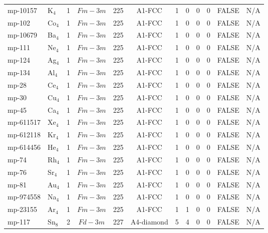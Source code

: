 {\begin{longtable}{llcccccccccc}
    mp-10157 & K$_{4}$ & 1     & $Fm-3m$ & 225   & A1-FCC & 1     & 0     & 0     & 0     & FALSE & N/A \\
    mp-102 & Co$_{4}$ & 1     & $Fm-3m$ & 225   & A1-FCC & 1     & 0     & 0     & 0     & FALSE & N/A \\
    mp-10679 & Ba$_{4}$ & 1     & $Fm-3m$ & 225   & A1-FCC & 1     & 0     & 0     & 0     & FALSE & N/A \\
    mp-111 & Ne$_{4}$ & 1     & $Fm-3m$ & 225   & A1-FCC & 1     & 0     & 0     & 0     & FALSE & N/A \\
    mp-124 & Ag$_{4}$ & 1     & $Fm-3m$ & 225   & A1-FCC & 1     & 0     & 0     & 0     & FALSE & N/A \\
    mp-134 & Al$_{4}$ & 1     & $Fm-3m$ & 225   & A1-FCC & 1     & 0     & 0     & 0     & FALSE & N/A \\
    mp-28 & Ce$_{4}$ & 1     & $Fm-3m$ & 225   & A1-FCC & 1     & 0     & 0     & 0     & FALSE & N/A \\
    mp-30 & Cu$_{4}$ & 1     & $Fm-3m$ & 225   & A1-FCC & 1     & 0     & 0     & 0     & FALSE & N/A \\
    mp-45 & Ca$_{4}$ & 1     & $Fm-3m$ & 225   & A1-FCC & 1     & 0     & 0     & 0     & FALSE & N/A \\
    mp-611517 & Xe$_{4}$ & 1     & $Fm-3m$ & 225   & A1-FCC & 1     & 0     & 0     & 0     & FALSE & N/A \\
    mp-612118 & Kr$_{4}$ & 1     & $Fm-3m$ & 225   & A1-FCC & 1     & 0     & 0     & 0     & FALSE & N/A \\
    mp-614456 & He$_{4}$ & 1     & $Fm-3m$ & 225   & A1-FCC & 1     & 0     & 0     & 0     & FALSE & N/A \\
    mp-74 & Rh$_{4}$ & 1     & $Fm-3m$ & 225   & A1-FCC & 1     & 0     & 0     & 0     & FALSE & N/A \\
    mp-76 & Sr$_{4}$ & 1     & $Fm-3m$ & 225   & A1-FCC & 1     & 0     & 0     & 0     & FALSE & N/A \\
    mp-81 & Au$_{4}$ & 1     & $Fm-3m$ & 225   & A1-FCC & 1     & 0     & 0     & 0     & FALSE & N/A \\
    mp-974558 & Na$_{4}$ & 1     & $Fm-3m$ & 225   & A1-FCC & 1     & 0     & 0     & 0     & FALSE & N/A \\
    mp-23155 & Ar$_{4}$ & 1     & $Fm-3m$ & 225   & A1-FCC & 1     & 1     & 0     & 0     & FALSE & N/A \\
    mp-117 & Sn$_{8}$ & 2     & $Fd-3m$ & 227   & A4-diamond & 5     & 4     & 0     & 0     & FALSE & N/A \\

\end{longtable}}
